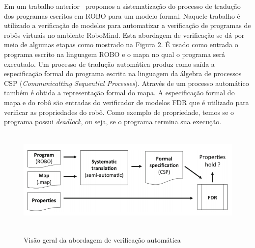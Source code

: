 
Em um trabalho anterior~\cite{nogueira} propomos a sistematização do processo de tradução dos programas escritos em ROBO para um modelo formal. Naquele trabalho é utilizado a verificação de modelos para automatizar a verificação de programas de robôs virtuais no ambiente RoboMind. Esta abordagem de verificação se dá por meio de algumas etapas como mostrado na Figura 2. É usado como entrada o programa escrito na linguagem ROBO e o mapa no qual o programa será executado. Um processo de tradução automática produz como saída a especificação formal do programa escrita na linguagem da álgebra de processos CSP (\textit{Communicatting Sequential Processes}). Através de um processo automático também é obtida a representação formal do mapa. A especificação formal do mapa e do robô são entradas do verificador de modelos FDR que é utilizado para verificar as propriedades do robô. Como exemplo de propriedade, temos se o programa possui \textit{deadlock}, ou seja, se o programa termina sua execução. 

\begin{figure}[h]
\centering
\caption{Visão geral da abordagem de verificação automática}
\includegraphics[height=5cm]{figuras/approach_workflow.png}
\label{fig:fluxograma}
\end{figure} 


